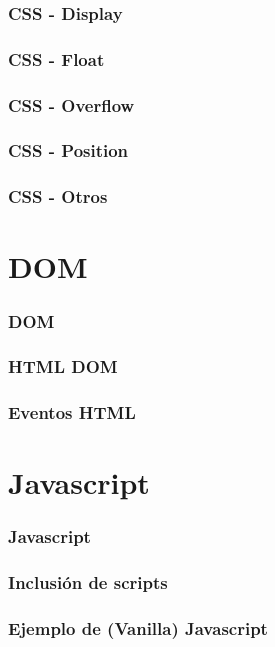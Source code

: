 \documentclass[a4paper,slidestop,xcolor=pst,blue]{beamer}
\begin{document}
\begin{frame}[c]
    \frametitle{CSS - Display}
\end{frame}

\begin{frame}[c]
    \frametitle{CSS - Float}
\end{frame}

\begin{frame}[c]
    \frametitle{CSS - Overflow}
\end{frame}

\begin{frame}[c]
    \frametitle{CSS - Position}
\end{frame}

\begin{frame}[c]
    \frametitle{CSS - Otros}
\end{frame}

\section{DOM}

\begin{frame}[c]
    \frametitle{DOM}
\end{frame}

\begin{frame}[c]
    \frametitle{HTML DOM}
\end{frame}

\begin{frame}[c]
    \frametitle{Eventos HTML}
\end{frame}

\section{Javascript}

\begin{frame}[c]
    \frametitle{Javascript}
\end{frame}

\begin{frame}[c]
    \frametitle{Inclusión de scripts}
\end{frame}

\begin{frame}[c]
    \frametitle{Ejemplo de (Vanilla) Javascript}
\end{frame}
\end{document}
